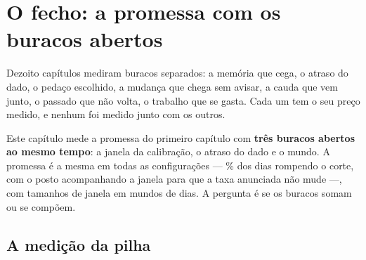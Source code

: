 \chapter{O fecho: a promessa com os buracos abertos}\label{cap:fecho}

Dezoito capítulos mediram buracos separados: a memória que cega, o atraso do dado, o pedaço
escolhido, a mudança que chega sem avisar, a cauda que vem junto, o passado que não volta, o trabalho
que se gasta. Cada um tem o seu preço medido, e nenhum foi medido junto com os outros.

Este capítulo mede a promessa do primeiro capítulo com \textbf{três buracos abertos ao mesmo tempo}: a
janela da calibração, o atraso do dado e o mundo. A promessa é a mesma em todas as
\numFechoConfiguracoes{} configurações --- \numPromessaPct{}\% dos dias rompendo o corte, com o posto
acompanhando a janela para que a taxa anunciada não mude ---, com \numFechoJanelas{} tamanhos de
janela em mundos de \numFechoDias{} dias. A pergunta é se os buracos somam ou se compõem.

\section{A medição da pilha}

